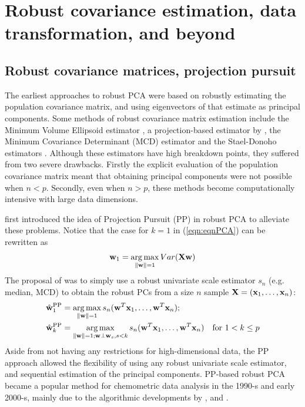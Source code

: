 \section{Robust covariance estimation, data transformation, and beyond}
\label{Section:sec2}

\subsection{Robust covariance matrices, projection pursuit}

The earliest approaches to robust PCA were based on robustly estimating the population covariance matrix, and using eigenvectors of that estimate as principal components. Some methods of robust covariance matrix estimation include the Minimum Volume Ellipsoid estimator \citep{Rousseeuw84}, a projection-based estimator by \citep{maronna76}, the Minimum Covariance Determinant (MCD) estimator \citep{rousseeuw85} and the Stael-Donoho estimators \citep{MaronnaYohai95,ZuoCui05}. Although these estimators have high breakdown points, they suffered from two severe drawbacks. Firstly the explicit evaluation of the population covariance matrix meant that obtaining principal components were not possible when $n < p$. Secondly, even when $n > p$, these methods become computationally intensive with large data dimensions.

\cite{LiChen85} first introduced the idea of Projection Pursuit (PP) in robust PCA to alleviate these problems. Notice that the case for $k=1$ in (\ref{eqn:eqnPCA}) can be rewritten as
%
$$
{\bf{w}}_1 = \operatorname*{arg\,max}_{\| {\bf{w}} \| = 1} Var ({\mathbf{X}} {\bf{w}})
$$
%
The proposal of \cite{LiChen85} was to simply use a robust univariate scale estimator $s_n$ (e.g. median, MCD) to obtain the robust PCs from a size $n$ sample ${\mathbf{X}} = ({\bf{x}}_1, \ldots, {\bf{x}}_n)$:
%
\begin{align*}
\hat {{\bf{w}}}_1^\text{PP} &= \operatorname*{arg\,max}_{\| {\bf{w}} \| = 1} s_n ( {\bf{w}}^T {\bf{x}}_1, \ldots, {\bf{w}}^T {\bf{x}}_n );\\
\hat {{\bf{w}}}_k^\text{PP} &= \operatorname*{arg\,max}_{\| {\bf{w}} \| = 1; {\bf{w}} \perp {\bf{w}}_s, s < k} s_n ( {\bf{w}}^T {\bf{x}}_1, \ldots, {\bf{w}}^T {\bf{x}}_n ) \quad \text{for } 1< k \leq p
\end{align*}
%
Aside from not having any restrictions for high-dimensional data, the PP approach allowed the flexibility of using any robust univariate scale estimator, and sequential estimation of the principal components. PP-based robust PCA became a popular method for chemometric data analysis in the 1990-s and early 2000-s, mainly due to the algorithmic developments by \cite{XieEtal93}, \cite{HubertEtal02} and \cite{CrouxEtal07}.

